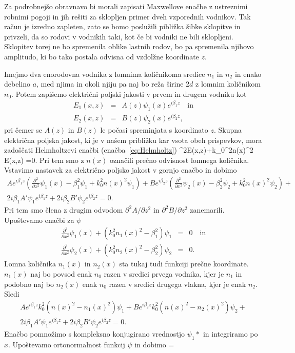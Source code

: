 Za podrobnejšo obravnavo bi morali zapisati Maxwellove enačbe z ustreznimi robnimi pogoji 
in jih rešiti za sklopljen primer dveh vzporednih vodnikov. Tak račun je izredno zapleten, 
zato se bomo poslužili pibližka šibke sklopitve in privzeli, da so rodovi v vodnikih taki, 
kot če bi vodniki ne bili sklopljeni.
Sklopitev torej ne bo spremenila oblike lastnih rodov, bo pa spremenila njihovo amplitudo, ki 
bo tako postala odvisna od vzdolžne koordinate $z$.

Imejmo dva enorodovna vodnika z lomnima količnikoma sredice $n_1$ in $n_2$ in enako 
debelino $a$, med njima in okoli njiju pa naj bo reža širine $2d$ z lomnim količnikom $n_0$. 
Potem zapišemo električni poljski jakosti v prvem in drugem vodniku kot
\begin{eqnarray}
E_1(x,z) &=& A(z) \psi_1(x) e^{i \beta_1 z} \quad \mathrm{in}\\
E_2(x,z) &=& B(z) \psi_2(x) e^{i \beta_2 z},
\label{eq:10_ampl}
\end{eqnarray}
pri čemer se $A(z)$ in $B(z)$ le počasi spreminjata s koordinato $z$. Skupna električna poljska
jakost, ki je v našem približku kar vsota obeh prispevkov, mora zadoščati Helmholtzevi enačbi
(enačba~\ref{eq:Helmholtz})
\beq
\nabla^{2}E(x,z)+k_0^{2}n(x)^2 E(x,z) =0.
\eeq
Pri tem smo z $n(x)$ označili prečno odvisnost lomnega količnika.
Vstavimo nastavek za električno poljsko jakost v gornjo enačbo in dobimo
\begin{multline}
A e^{i \beta_1 z}\left(\frac{\partial^2}{\partial x^2}\psi_1(x) - \beta_1^2\psi_1 + k_0^2
n(x)^2 \psi_1 \right)
+ 
B e^{i \beta_2 z}\left(\frac{\partial^2}{\partial x^2}\psi_2(x) - \beta_2^2\psi_2 + k_0^2
n(x)^2 \psi_2 \right)+ \\2 i \beta_1 A' \psi_1 e^{i \beta_1 z}+
2 i \beta_2 B' \psi_2 e^{i \beta_2 z} = 0.
\end{multline}
Pri tem smo člena z drugim odvodom $\partial^2 A/\partial z^2$ in $\partial^2 B/\partial z^2$
zanemarili. Upoštevamo enačbi za $\psi$
\begin{eqnarray}
\frac{\partial^2}{\partial x^2}\psi_1(x) + \left(k_0^2n_1(x)^2-\beta_1^2\right) \psi_1 &=&0 \quad \mathrm{in} \\
\frac{\partial^2}{\partial x^2}\psi_2(x) + \left(k_0^2n_2(x)^2-\beta_2^2\right) \psi_2 &=&0.
\end{eqnarray}
Lomna količnika $n_1(x)$ in $n_2(x)$ sta tukaj tudi funkciji prečne koordinate. $n_1(x)$ naj bo 
povsod enak $n_0$ razen v sredici prvega vodnika, kjer je $n_1$ in podobno naj bo 
$n_2(x)$ enak $n_0$ razen v sredici drugega vlakna, kjer je enak $n_2$. Sledi
\begin{multline}
A e^{i \beta_1 z}k_0^2\left(n(x)^2 -n_1(x)^2\right)\psi_1 
+ 
B e^{i \beta_2 z}k_0^2\left(n(x)^2 -n_2(x)^2\right)\psi_2 + \\2 i \beta_1 A' \psi_1 e^{i \beta_1 z}+
2 i \beta_2 B' \psi_2 e^{i \beta_2 z} = 0.
\end{multline}
Enačbo pomnožimo s kompleksno konjugirano vrednostjo $\psi_1*$ in integriramo po $x$.
Upoštevamo ortonormalnost funkcij $\psi$ in dobimo 
\beq
{} = 
\eeq





